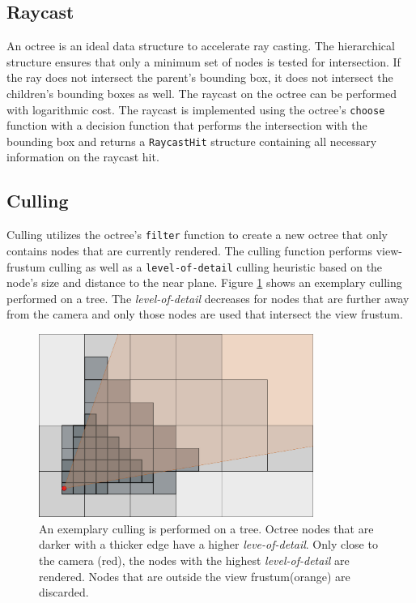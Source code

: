 \subsection{Raycast}

An octree is an ideal data structure to accelerate ray casting. The hierarchical structure ensures that only a minimum set of nodes is tested for intersection. If the ray does not intersect the parent's bounding box, it does not intersect the children's bounding boxes as well. The raycast on the octree can be performed with logarithmic cost. The raycast is implemented using the octree's \verb|choose| function with a decision function that performs the intersection with the bounding box and returns a \verb|RaycastHit| structure containing all necessary information on the raycast hit. 


\subsection{Culling}

Culling utilizes the octree's \verb|filter| function to create a new octree that only contains nodes that are currently rendered. The culling function performs view-frustum culling as well as a \verb|level-of-detail| culling heuristic based on the node's size and distance to the near plane. Figure \ref{fig:octreeCulling} shows an exemplary culling performed on a tree. The \textit{level-of-detail} decreases for nodes that are further away from the camera and only those nodes are used that intersect the view frustum.

\begin{figure}
    \centering
    \includegraphics[width=0.8\textwidth]{Implementation/octreeCulling.png}
    \caption{An exemplary culling is performed on a tree. Octree nodes that are darker with a thicker edge have a higher \textit{leve-of-detail}. Only close to the camera (red), the nodes with the highest \textit{level-of-detail} are rendered. Nodes that are outside the view frustum(orange) are discarded. }
    \label{fig:octreeCulling}
\end{figure}


